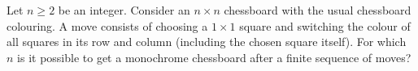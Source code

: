 Let $n\geq 2$ be an integer.
Consider an $n\times n$ chessboard with the usual chessboard colouring.
A move consists of choosing a $1\times 1$ square and switching the colour of all squares in its row and column
(including the chosen square itself).
For which $n$ is it possible to get a monochrome chessboard after a finite sequence of moves?

